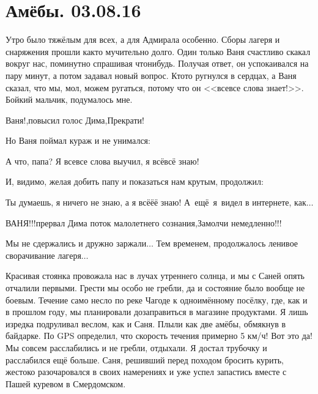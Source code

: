 \chapter{Амёбы. 03.08.16} 

Утро было тяжёлым для всех, а для Адмирала особенно. Сборы лагеря и снаряжения прошли как\sdash то мучительно долго. Один только Ваня счастливо скакал вокруг нас, поминутно спрашивая что\sdash нибудь. Получая ответ, он успокаивался на пару минут, а потом задавал новый вопрос. Кто\sdash то ругнулся в сердцах, а Ваня сказал, что мы, мол, можем ругаться, потому что он <<все\sdash все слова знает!>>. Бойкий мальчик, подумалось мне. 


\diagdash Ваня!,\mdash повысил голос Дима,\mdash Прекрати! 

Но Ваня поймал кураж и не унимался: 

\diagdash А что, папа? Я все\sdash все слова выучил, я всё\sdash всё знаю! 

И, видимо, желая добить папу и показаться нам крутым, продолжил: 

\diagdash Ты думаешь, я ничего не знаю, а я всё\sdash ё\sdash ё знаю! А~ещё~я~видел в интернете, как$\ldots$ 

\diagdash ВАНЯ!!!\mdash прервал Дима поток малолетнего сознания,\mdash Замолчи немедленно!!! 

Мы не сдержались и  дружно заржали$\ldots$ Тем временем, продолжалось ленивое сворачивание лагеря$\ldots$ 

Красивая стоянка провожала нас в лучах утреннего солнца, и мы с Саней опять отчалили первыми. Грести мы особо не гребли, да и состояние было вообще не боевым. Течение само несло по реке Чагоде к одноимённому посёлку, где, как и в прошлом году, мы планировали дозаправиться в магазине продуктами. Я лишь изредка подруливал веслом, как и Саня. Плыли как две амёбы, обмякнув в байдарке. По GPS определил, что скорость течения примерно 5 км/ч! Вот это да! Мы совсем расслабились и не гребли, отдыхали. Я достал трубочку и расслабился ещё больше. Саня, решивший перед походом бросить курить, жестоко разочаровался в своих намерениях и уже успел запастись вместе с Пашей куревом в Смердомском.

